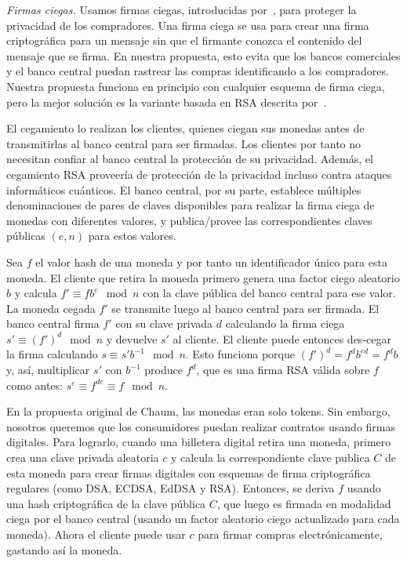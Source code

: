 \documentclass[10pt,spanish]{article}
\begin{document}
\emph{Firmas ciegas.} Usamos firmas ciegas, introducidas
por~\citet{Chaum1983}, para proteger la privacidad de los compradores. Una
firma ciega se usa para crear una firma criptográfica para un mensaje sin que
el firmante conozca el contenido del mensaje que se firma. En nuestra
propuesta, esto evita que los bancos comerciales y el banco central puedan
rastrear las compras identificando a los compradores. Nuestra propuesta
funciona en principio con cualquier esquema de firma ciega, pero la mejor
solución es la variante basada en RSA descrita por~\citet{Chaum1983}.

El cegamiento lo realizan los clientes, quienes ciegan sus monedas antes
de transmitirlas al banco central para ser firmadas. Los clientes por
tanto no necesitan confiar al banco central la protección de su
privacidad. Además, el cegamiento RSA proveería de protección de la
privacidad incluso contra ataques informáticos cuánticos. El banco
central, por su parte, establece múltiples denominaciones de pares de
claves disponibles para realizar la firma ciega de monedas con
diferentes valores, y publica/provee las correspondientes claves
públicas $(e, n)$ para estos valores.

Sea $f$ el valor hash de una moneda y por tanto un identificador único
para esta moneda. El cliente que retira la moneda primero genera una
factor ciego aleatorio $b$ y calcula
$f' \equiv fb^{e} \mod n$
con la clave pública del banco central para ese valor.
La moneda cegada $f'$ se transmite luego
al banco central para ser firmada. El banco central firma $f'$ con su
clave privada $d$ calculando la firma ciega
$s' \equiv \left(f' \right)^{d} \mod n$ y devuelve
$s'$ al cliente.
El cliente puede entonces des-cegar la firma calculando
$s \equiv s'b^{- 1} \mod n$.
Esto funciona porque
$\left( f' \right)^d = f^db^{ed} = f^db$ y, así,
multiplicar $s'$ con $b^{- 1}$ produce $f^d$, que es una firma RSA
válida sobre $f$ como antes:
$s^e \equiv f^{de} \equiv f \mod n$.

En la propuesta original de Chaum, las monedas eran solo tokens. Sin
embargo, nosotros queremos que los consumidores puedan realizar
contratos usando firmas digitales. Para lograrlo, cuando una billetera
digital retira una moneda, primero crea una clave privada aleatoria
$c$ y calcula la correspondiente clave publica $C$ de esta moneda
para crear firmas digitales con esquemas de firma criptográfica
regulares (como DSA, ECDSA, EdDSA y RSA). Entonces, se deriva $f$
usando una hash criptográfica de la clave pública $C$, que luego es
firmada en modalidad ciega por el banco central (usando un factor
aleatorio ciego actualizado para cada moneda). Ahora el cliente puede
usar $c$ para firmar compras electrónicamente, gastando así la moneda.
\end{document}
